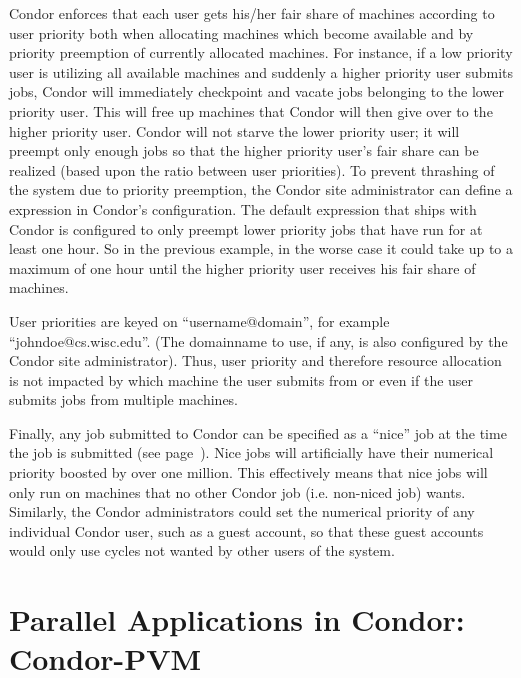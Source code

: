 Condor enforces that each user gets his/her fair share of machines
according to user priority both when allocating machines which become
available and by priority preemption of currently allocated machines.
For instance, if a low priority user is utilizing all available machines
and suddenly a higher priority user submits jobs, Condor will
immediately checkpoint and vacate jobs belonging to the lower priority
user. This will free up machines that Condor will then give over to the
higher priority user. Condor will not starve the lower priority user; it
will preempt only enough jobs so that the higher priority user's fair
share can be realized (based upon the ratio between user priorities). To
prevent thrashing of the system due to priority preemption, the Condor 
site administrator can define a  expression in Condor's configuration.
The default expression that ships with Condor is configured to only preempt 
lower priority jobs that have run
for at least one hour. So in the previous example, in the worse case it
could take up to a maximum of one hour until the higher priority user
receives his fair share of machines. 

User priorities are keyed on ``username@domain'', for example
``johndoe@cs.wisc.edu''. (The domainname to use, if any, is also configured by
the Condor site administrator).  Thus, user priority and therefore resource
allocation is not impacted by which machine the user submits from or
even if the user submits jobs from multiple machines.

Finally, any job submitted to Condor can be specified as a ``nice'' job at 
the time the job is submitted (see page~\pageref{man-condor-submit-nice}).
Nice jobs will artificially have their numerical priority boosted by
over one million. This effectively means that nice jobs will only run on
machines that no other Condor job (i.e. non-niced job) wants. Similarly,
the Condor administrators could set the numerical priority of any
individual Condor user, such as a guest account, so that these guest
accounts would only use cycles not wanted by other users of the system.


\section{Parallel Applications in Condor: Condor-PVM}
\label{sec:PVM}


